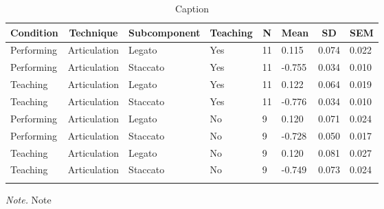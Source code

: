 \documentclass[
  man,floatsintext]{apa6}
\begin{document}
\begin{table}[tbp]

\begin{center}
\begin{threeparttable}

\caption{\label{tab:art-teaching-desc-2}Caption}

\begin{tabular}{llllllll}
\toprule
Condition & \multicolumn{1}{c}{Technique} & \multicolumn{1}{c}{Subcomponent} & \multicolumn{1}{c}{Teaching} & \multicolumn{1}{c}{N} & \multicolumn{1}{c}{Mean} & \multicolumn{1}{c}{SD} & \multicolumn{1}{c}{SEM}\\
\midrule
Performing & Articulation & Legato & Yes & 11 & 0.115 & 0.074 & 0.022\\
Performing & Articulation & Staccato & Yes & 11 & -0.755 & 0.034 & 0.010\\
Teaching & Articulation & Legato & Yes & 11 & 0.122 & 0.064 & 0.019\\
Teaching & Articulation & Staccato & Yes & 11 & -0.776 & 0.034 & 0.010\\
Performing & Articulation & Legato & No & 9 & 0.120 & 0.071 & 0.024\\
Performing & Articulation & Staccato & No & 9 & -0.728 & 0.050 & 0.017\\
Teaching & Articulation & Legato & No & 9 & 0.120 & 0.081 & 0.027\\
Teaching & Articulation & Staccato & No & 9 & -0.749 & 0.073 & 0.024\\
\bottomrule
\addlinespace
\end{tabular}

\begin{tablenotes}[para]
\normalsize{\textit{Note.} Note}
\end{tablenotes}

\end{threeparttable}
\end{center}

\end{table}
\end{document}
